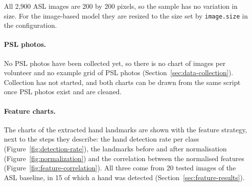 
All 2{,}900 ASL images are 200 by 200 pixels, so the sample has no variation in size. For the image-based model they are resized to the size set by \texttt{image.size} in the configuration.

\paragraph{PSL photos.} No PSL photos have been collected yet, so there is no chart of images per volunteer and no example grid of PSL photos (Section~\ref{sec:data-collection}). Collection has not started, and both charts can be drawn from the same script once PSL photos exist and are cleaned.

\paragraph{Feature charts.} The charts of the extracted hand landmarks are shown with the feature strategy, next to the steps they describe: the hand detection rate per class (Figure~\ref{fig:detection-rate}), the landmarks before and after normalisation (Figure~\ref{fig:normalization}) and the correlation between the normalised features (Figure~\ref{fig:feature-correlation}). All three come from 20 tested images of the ASL baseline, in 15 of which a hand was detected (Section~\ref{sec:feature-results}).
